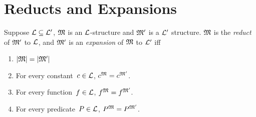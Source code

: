 \documentclass[open-logic-section]{subfiles}
\begin{document}
\section{Reducts and Expansions}

\begin{defn}
Suppose $\mathcal L \subseteq \mathcal L'$, $\mathfrak M$ is an
$\mathcal L$-structure and $\mathfrak M'$ is a $\mathcal L'$ structure.
$\mathfrak M$ is the \emph{reduct} of $\mathfrak M'$ to $\mathcal L$, and
$\mathfrak M'$ is an \emph{expansion} of $\mathfrak M$ to $\mathcal L'$ iff
\begin{enumerate}
\item $\left| \mathfrak M \right| = \left| \mathfrak M' \right|$
\item For every constant~$c \in \mathcal L$, $c^{\mathfrak M} =
  c^{\mathfrak M'}$.
\item For every function~$f \in \mathcal L$, $f^{\mathfrak M} =
  f^{\mathfrak M'}$.
\item For every predicate~$P \in \mathcal L$, $P^{\mathfrak M} =
  P^{\mathfrak M'}$.
\end{enumerate}
\end{defn}

\end{document}
